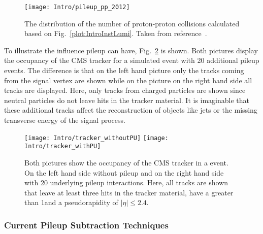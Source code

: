 \begin{figure}[Htb]
    \centering
    \texttt{[image: Intro/pileup\_pp\_2012]}
    \caption[Number of proton proton collisions]{The distribution of the number of proton-proton collisions calculated based on Fig.~\ref{plot:IntroInstLumi}. Taken from reference~. \label{plot:IntroPileupDistr}}
\end{figure}

To illustrate the influence pileup can have, Fig.~\ref{plot:IntroOccuTracker} is shown. Both pictures display the occupancy of the CMS tracker for a simulated \ttbar event with 20 additional pileup events. The difference is that on the left hand picture only the tracks coming from the signal vertex are shown while on the picture on the right hand side all tracks are displayed. Here, only tracks from charged particles are shown since neutral particles do not leave hits in the tracker material. It is imaginable that these additional tracks affect the reconstruction of objects like jets or the missing transverse energy of the signal process.

\begin{figure}[Htb]
    \centering
    \texttt{[image: Intro/tracker\_withoutPU]}
    \texttt{[image: Intro/tracker\_withPU]}
    \caption[Occupancy of the tracker with and without pileup]{Both pictures show the occupancy of the CMS tracker in a \ttbar event. On the left hand side without pileup and on the right hand side with 20 underlying pileup interactions. Here, all tracks are shown that leave at least three hits in the tracker material, have a \pt greater than 1\GeVc and a pseudorapidity of $\left|\eta\right|\leq2.4$. \label{plot:IntroOccuTracker}}
\end{figure}

\subsubsection{Current Pileup Subtraction Techniques \label{sec:IntroCurPST}}

